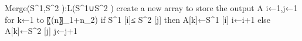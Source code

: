 Merge(S^1,S^2 ):L(S^1∪S^2 )
create a new array to store the output A
i←1,j←1
for k←1 to 〖(n〗_1+n_2)
    if S^1 [i]≤ S^2 [j]  then
        A[k]←S^1 [i]
        i←i+1
    else 
        A[k]←S^2 [j]
        j←j+1
